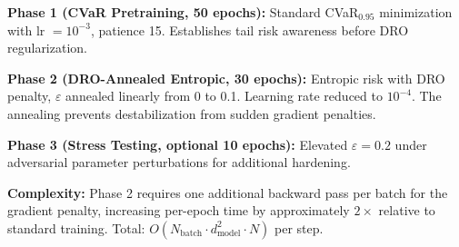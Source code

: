 \textbf{Phase 1 (CVaR Pretraining, 50 epochs):} Standard CVaR$_{0.95}$ minimization with lr $= 10^{-3}$, patience 15. Establishes tail risk awareness before DRO regularization.

\textbf{Phase 2 (DRO-Annealed Entropic, 30 epochs):} Entropic risk with DRO penalty, $\varepsilon$ annealed linearly from 0 to 0.1. Learning rate reduced to $10^{-4}$. The annealing prevents destabilization from sudden gradient penalties.

\textbf{Phase 3 (Stress Testing, optional 10 epochs):} Elevated $\varepsilon = 0.2$ under adversarial parameter perturbations for additional hardening.

\textbf{Complexity:} Phase 2 requires one additional backward pass per batch for the gradient penalty, increasing per-epoch time by approximately $2\times$ relative to standard training. Total: $O(N_{\mathrm{batch}} \cdot d_{\mathrm{model}}^2 \cdot N)$ per step.
